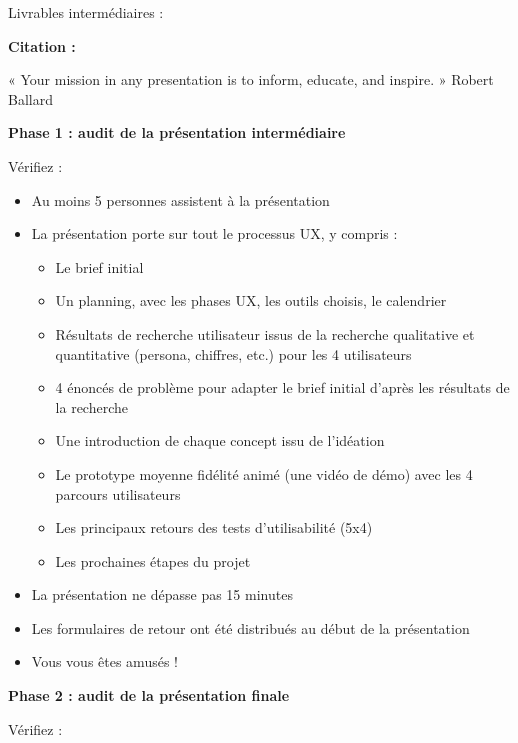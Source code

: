 Livrables intermédiaires :

\textbf{Citation :}

« Your mission in any presentation is to inform, educate, and inspire. » Robert Ballard

\medskip

\textbf{Phase 1 : audit de la présentation intermédiaire}

Vérifiez :

\begin{itemize}
\item Au moins 5 personnes assistent à la présentation
\item La présentation porte sur tout le processus UX, y compris :
\begin{itemize}
\item Le brief initial
\item Un planning, avec les phases UX, les outils choisis, le calendrier
\item Résultats de recherche utilisateur issus de la recherche qualitative et quantitative (persona, chiffres, etc.) pour les 4 utilisateurs
\item 4 énoncés de problème pour adapter le brief initial d'après les résultats de la recherche
\item Une introduction de chaque concept issu de l'idéation
\item Le prototype moyenne fidélité animé (une vidéo de démo) avec les 4 parcours utilisateurs
\item Les principaux retours des tests d'utilisabilité (5x4)
\item Les prochaines étapes du projet
\end{itemize}
\item La présentation ne dépasse pas 15 minutes
\item Les formulaires de retour ont été distribués au début de la présentation
\item Vous vous êtes amusés !
\end{itemize}

\medskip

\textbf{Phase 2 : audit de la présentation finale}

Vérifiez :


